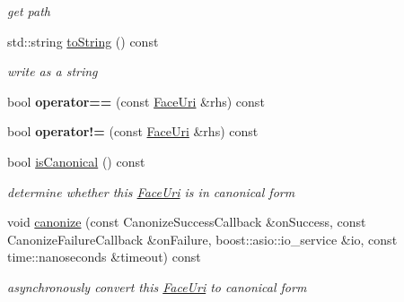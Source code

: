 \begin{DoxyCompactItemize}
\begin{DoxyCompactList}\small\item\em get path \end{DoxyCompactList}\item 
std\+::string \hyperlink{classndn_1_1util_1_1FaceUri_a2827c1ae6a9179c3fad0716a99b56b63}{to\+String} () const\hypertarget{classndn_1_1util_1_1FaceUri_a2827c1ae6a9179c3fad0716a99b56b63}{}\label{classndn_1_1util_1_1FaceUri_a2827c1ae6a9179c3fad0716a99b56b63}

\begin{DoxyCompactList}\small\item\em write as a string \end{DoxyCompactList}\item 
bool {\bfseries operator==} (const \hyperlink{classndn_1_1util_1_1FaceUri}{Face\+Uri} \&rhs) const\hypertarget{classndn_1_1util_1_1FaceUri_afe96946c6ac5f2dde53a3cfce4ef6461}{}\label{classndn_1_1util_1_1FaceUri_afe96946c6ac5f2dde53a3cfce4ef6461}

\item 
bool {\bfseries operator!=} (const \hyperlink{classndn_1_1util_1_1FaceUri}{Face\+Uri} \&rhs) const\hypertarget{classndn_1_1util_1_1FaceUri_a36e3e15f6d08fdc2198832de7217ced6}{}\label{classndn_1_1util_1_1FaceUri_a36e3e15f6d08fdc2198832de7217ced6}

\item 
bool \hyperlink{classndn_1_1util_1_1FaceUri_ab5d70f1c0efcf14f350c1b7bc49aa5d3}{is\+Canonical} () const
\begin{DoxyCompactList}\small\item\em determine whether this \hyperlink{classndn_1_1util_1_1FaceUri}{Face\+Uri} is in canonical form \end{DoxyCompactList}\item 
void \hyperlink{classndn_1_1util_1_1FaceUri_a39275a665fdbd326d5eb512857435173}{canonize} (const Canonize\+Success\+Callback \&on\+Success, const Canonize\+Failure\+Callback \&on\+Failure, boost\+::asio\+::io\+\_\+service \&io, const time\+::nanoseconds \&timeout) const
\begin{DoxyCompactList}\small\item\em asynchronously convert this \hyperlink{classndn_1_1util_1_1FaceUri}{Face\+Uri} to canonical form \end{DoxyCompactList}\end{DoxyCompactItemize}
